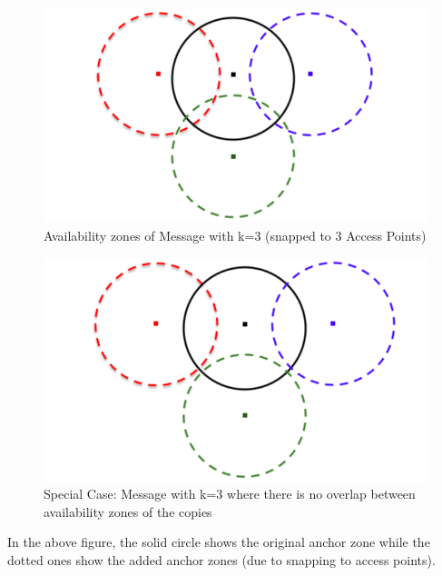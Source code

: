 	\vspace{1mm}
	\begin{figure}[h!]
		\centering
		\includegraphics[scale=0.3]{./figures/snapped-to-ap-3}
		\caption{Availability zones of Message with k=3 (snapped to 3 Access Points)}
	\end{figure}
	\begin{figure}[h!]
		\centering
		\includegraphics[scale=0.3]{./figures/snapped-to-ap-4}
		\caption{Special Case: Message with k=3 where there is no overlap between availability zones of the copies}
	\end{figure}
In the above figure, the solid circle shows the original anchor zone while the dotted ones show the added anchor zones (due to snapping to access points).

